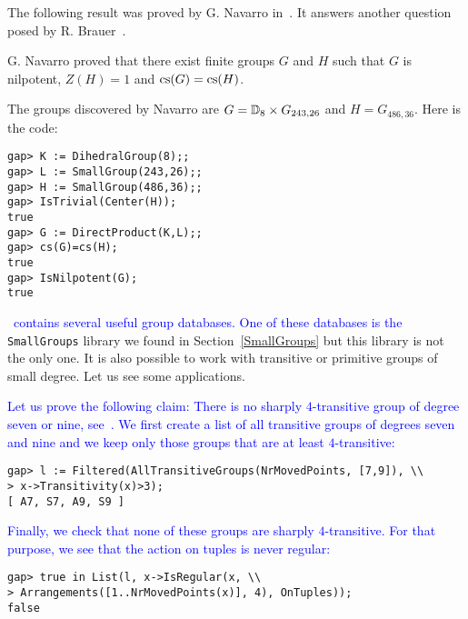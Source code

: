 The following result was proved by G. Navarro in~\cite{MR3210919}. It answers 
another question posed by R. Brauer~\cite[Question 4(ii)]{MR2875589}.

\begin{example}
  G. Navarro proved that there exist finite groups $G$ and $H$ such that $G$ is
  nilpotent, $Z(H)=1$ and $\operatorname{cs}(G)=\operatorname{cs}(H)$.

  The groups discovered by Navarro are $G=\mathbb{D}_8\times G_{243,26}$ and
  $H=G_{486,36}$. Here is the code:
\begin{lstlisting}
gap> K := DihedralGroup(8);;
gap> L := SmallGroup(243,26);;
gap> H := SmallGroup(486,36);;
gap> IsTrivial(Center(H));
true
gap> G := DirectProduct(K,L);;
gap> cs(G)=cs(H);
true
gap> IsNilpotent(G);
true
\end{lstlisting}
\end{example}
	
%

\textcolor{blue}{
\GAP~contains several useful group databases. One of these databases is the}
\verb+SmallGroups+ library we found in Section~\ref{SmallGroups} but this
library is not the only one. It is also possible to work with transitive or
primitive groups of small degree. Let us see some applications.

\begin{example}
\textcolor{blue}{
Let us prove the following claim: There is no sharply $4$-transitive group of
degree seven or nine, see~\cite[Exercise 1.18]{MR1721031}. We first create a
list of all transitive groups of degrees seven and nine and we keep only those
groups that are at least $4$-transitive:}
\begin{lstlisting}
gap> l := Filtered(AllTransitiveGroups(NrMovedPoints, [7,9]), \\
> x->Transitivity(x)>3);                                
[ A7, S7, A9, S9 ]
\end{lstlisting}
\textcolor{blue}{
Finally, we check that none of these groups 
are sharply $4$-transitive. For that purpose, we see that the action on tuples
is never regular:}
\begin{lstlisting}
gap> true in List(l, x->IsRegular(x, \\ 
> Arrangements([1..NrMovedPoints(x)], 4), OnTuples));
false
\end{lstlisting}
\end{example}

